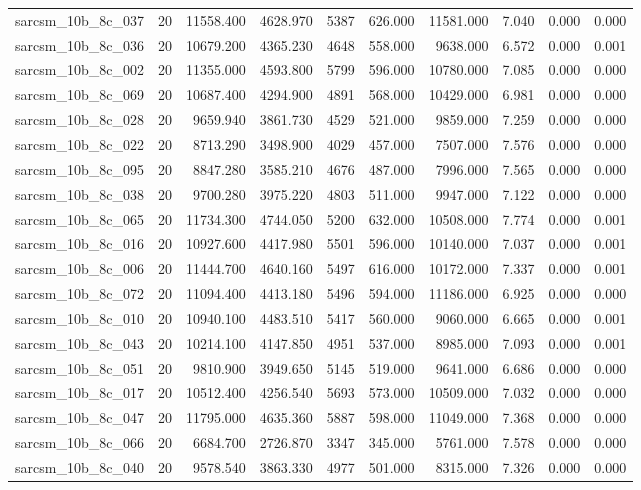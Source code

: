 \begin{tabular}{lrrrrrrrrr}
sarcsm\_10b\_8c\_037 & 20 & 11558.400 & 4628.970 & 5387 & 626.000 & 11581.000 & 7.040 & 0.000 & 0.000 \\
sarcsm\_10b\_8c\_036 & 20 & 10679.200 & 4365.230 & 4648 & 558.000 & 9638.000 & 6.572 & 0.000 & 0.001 \\
sarcsm\_10b\_8c\_002 & 20 & 11355.000 & 4593.800 & 5799 & 596.000 & 10780.000 & 7.085 & 0.000 & 0.000 \\
sarcsm\_10b\_8c\_069 & 20 & 10687.400 & 4294.900 & 4891 & 568.000 & 10429.000 & 6.981 & 0.000 & 0.000 \\
sarcsm\_10b\_8c\_028 & 20 & 9659.940 & 3861.730 & 4529 & 521.000 & 9859.000 & 7.259 & 0.000 & 0.000 \\
sarcsm\_10b\_8c\_022 & 20 & 8713.290 & 3498.900 & 4029 & 457.000 & 7507.000 & 7.576 & 0.000 & 0.000 \\
sarcsm\_10b\_8c\_095 & 20 & 8847.280 & 3585.210 & 4676 & 487.000 & 7996.000 & 7.565 & 0.000 & 0.000 \\
sarcsm\_10b\_8c\_038 & 20 & 9700.280 & 3975.220 & 4803 & 511.000 & 9947.000 & 7.122 & 0.000 & 0.000 \\
sarcsm\_10b\_8c\_065 & 20 & 11734.300 & 4744.050 & 5200 & 632.000 & 10508.000 & 7.774 & 0.000 & 0.001 \\
sarcsm\_10b\_8c\_016 & 20 & 10927.600 & 4417.980 & 5501 & 596.000 & 10140.000 & 7.037 & 0.000 & 0.001 \\
sarcsm\_10b\_8c\_006 & 20 & 11444.700 & 4640.160 & 5497 & 616.000 & 10172.000 & 7.337 & 0.000 & 0.001 \\
sarcsm\_10b\_8c\_072 & 20 & 11094.400 & 4413.180 & 5496 & 594.000 & 11186.000 & 6.925 & 0.000 & 0.000 \\
sarcsm\_10b\_8c\_010 & 20 & 10940.100 & 4483.510 & 5417 & 560.000 & 9060.000 & 6.665 & 0.000 & 0.001 \\
sarcsm\_10b\_8c\_043 & 20 & 10214.100 & 4147.850 & 4951 & 537.000 & 8985.000 & 7.093 & 0.000 & 0.001 \\
sarcsm\_10b\_8c\_051 & 20 & 9810.900 & 3949.650 & 5145 & 519.000 & 9641.000 & 6.686 & 0.000 & 0.000 \\
sarcsm\_10b\_8c\_017 & 20 & 10512.400 & 4256.540 & 5693 & 573.000 & 10509.000 & 7.032 & 0.000 & 0.000 \\
sarcsm\_10b\_8c\_047 & 20 & 11795.000 & 4635.360 & 5887 & 598.000 & 11049.000 & 7.368 & 0.000 & 0.000 \\
sarcsm\_10b\_8c\_066 & 20 & 6684.700 & 2726.870 & 3347 & 345.000 & 5761.000 & 7.578 & 0.000 & 0.000 \\
sarcsm\_10b\_8c\_040 & 20 & 9578.540 & 3863.330 & 4977 & 501.000 & 8315.000 & 7.326 & 0.000 & 0.000 \\

\end{tabular}
